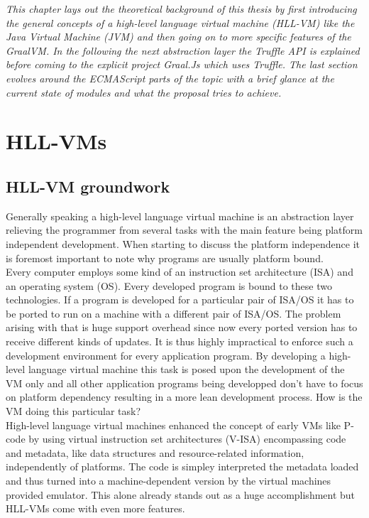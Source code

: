 \emph{This chapter lays out the theoretical background of this thesis by first introducing the general concepts of a high-level language virtual machine (HLL-VM) like the Java Virtual Machine (JVM) and then going on to more specific features of the GraalVM. In the following the next abstraction layer the Truffle API is explained before coming to the explicit project Graal.Js which uses Truffle. The last section evolves around the ECMAScript parts of the topic with a brief glance at the current state of modules and what the proposal tries to achieve.}

\section{HLL-VMs}
\subsection{HLL-VM groundwork}
Generally speaking a high-level language virtual machine is an abstraction layer relieving the programmer from several tasks with the main feature being platform independent development. When starting to discuss the platform independence it is foremost important to note why programs are usually platform bound.\\
Every computer employs some kind of an instruction set architecture (ISA) and an operating system (OS). Every developed program is bound to these two technologies. If a program is developed for a particular pair of ISA/OS it has to be ported to run on a machine with a different pair of ISA/OS. The problem arising with that is huge support overhead since now every ported version has to receive different kinds of updates. It is thus highly impractical to enforce such a development environment for every application program. By developing a high-level language virtual machine this task is posed upon the development of the VM only and all other application programs being developped don't have to focus on platform dependency resulting in a more lean development process. How is the VM doing this particular task?\\
High-level language virtual machines enhanced the concept of early VMs like P-code by using virtual instruction set architectures (V-ISA) encompassing code and metadata, like data structures and resource-related information, independently of platforms. The code is simpley interpreted the metadata loaded and thus turned into a machine-dependent version by the virtual machines provided emulator. This alone already stands out as a huge accomplishment but HLL-VMs come with even more features.\\
